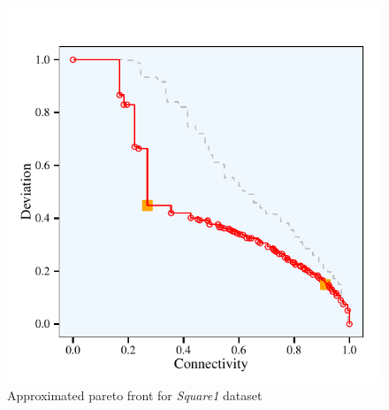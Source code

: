 \documentclass[parskip=half,DIV=14]{scrartcl}\usepackage[]{graphicx}\usepackage[]{color}
\makeatletter
\def\maxwidth{ %
  \ifdim\Gin@nat@width>\linewidth
    \linewidth
  \else
    \Gin@nat@width
  \fi
}
\newenvironment{knitrout}{}{} %
\makeatother
\begin{document}
\begin{figure}
\begin{center}
\begin{knitrout}
\color{fgcolor}

{\centering \includegraphics[width=\maxwidth]{figures/plots-printFront-1} 

}



\end{knitrout}
\caption{Approximated pareto front for \textit{Square1} dataset}
\label{fig:printpareto}
\end{center}
\end{figure}
\end{document}
